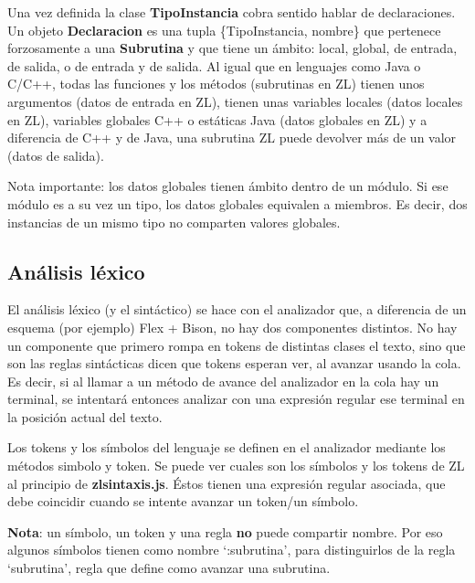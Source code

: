 \documentclass{report}
\begin{document}
	\vspace{10px}
	
	Una vez definida la clase \textbf{TipoInstancia} cobra sentido hablar de declaraciones. Un objeto \textbf{Declaracion} es una tupla \{TipoInstancia, nombre\} que pertenece forzosamente a una \textbf{Subrutina} y que tiene un ámbito: local, global, de entrada, de salida, o de entrada y de salida. Al igual que en lenguajes como Java o C/C++, todas las funciones y los métodos (subrutinas en ZL) tienen unos argumentos (datos de entrada en ZL), tienen unas variables locales (datos locales en ZL), variables globales C++ o estáticas Java (datos globales en ZL) y a diferencia de C++ y de Java, una subrutina ZL puede devolver más de un valor (datos de salida).
	
	\vspace{10px}
	\noindent
	Nota importante: los datos globales tienen ámbito dentro de un módulo. Si ese módulo es a su vez un tipo, los datos globales equivalen a miembros. Es decir, dos instancias de un mismo tipo no comparten valores globales. 
	
	
	\subsection{Análisis léxico}
	
	El análisis léxico (y el sintáctico) se hace con el analizador que, a diferencia de un esquema (por ejemplo) Flex + Bison, no hay dos componentes distintos. No hay un componente que primero rompa en tokens de distintas clases el texto, sino que son las reglas sintácticas dicen que tokens esperan ver, al avanzar usando la cola. Es decir, si al llamar a un método de avance del analizador en la cola hay un terminal, se intentará entonces analizar con una expresión regular ese terminal en la posición actual del texto. 
	
	Los tokens y los símbolos del lenguaje se definen en el analizador mediante los métodos simbolo y token. Se puede ver cuales son los símbolos y los tokens de ZL al principio de \textbf{zlsintaxis.js}. Éstos tienen una expresión regular asociada, que debe coincidir cuando se intente avanzar un token/un símbolo.
	
	\vspace{10px}
	\noindent
	\textbf{Nota}: un símbolo, un token y una regla \textbf{no} puede compartir nombre. Por eso algunos símbolos tienen como nombre `:subrutina', para distinguirlos de la regla `subrutina', regla que define como avanzar una subrutina.
	
\end{document}

